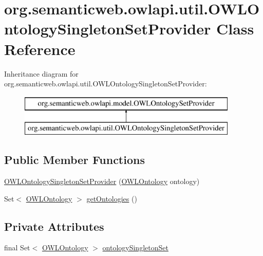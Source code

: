 \hypertarget{classorg_1_1semanticweb_1_1owlapi_1_1util_1_1_o_w_l_ontology_singleton_set_provider}{\section{org.\-semanticweb.\-owlapi.\-util.\-O\-W\-L\-Ontology\-Singleton\-Set\-Provider Class Reference}
\label{classorg_1_1semanticweb_1_1owlapi_1_1util_1_1_o_w_l_ontology_singleton_set_provider}
}
Inheritance diagram for org.\-semanticweb.\-owlapi.\-util.\-O\-W\-L\-Ontology\-Singleton\-Set\-Provider\-:\begin{figure}[H]
\begin{center}
\leavevmode
\includegraphics[height=2.000000cm]{classorg_1_1semanticweb_1_1owlapi_1_1util_1_1_o_w_l_ontology_singleton_set_provider}
\end{center}
\end{figure}
\subsection*{Public Member Functions}
\begin{DoxyCompactItemize}
\item 
\hyperlink{classorg_1_1semanticweb_1_1owlapi_1_1util_1_1_o_w_l_ontology_singleton_set_provider_a814a9665e0344720af43593ae91e731a}{O\-W\-L\-Ontology\-Singleton\-Set\-Provider} (\hyperlink{interfaceorg_1_1semanticweb_1_1owlapi_1_1model_1_1_o_w_l_ontology}{O\-W\-L\-Ontology} ontology)
\item 
Set$<$ \hyperlink{interfaceorg_1_1semanticweb_1_1owlapi_1_1model_1_1_o_w_l_ontology}{O\-W\-L\-Ontology} $>$ \hyperlink{classorg_1_1semanticweb_1_1owlapi_1_1util_1_1_o_w_l_ontology_singleton_set_provider_a3c30d79ea81f7f251f3189f958643ca8}{get\-Ontologies} ()
\end{DoxyCompactItemize}
\subsection*{Private Attributes}
\begin{DoxyCompactItemize}
\item 
final Set$<$ \hyperlink{interfaceorg_1_1semanticweb_1_1owlapi_1_1model_1_1_o_w_l_ontology}{O\-W\-L\-Ontology} $>$ \hyperlink{classorg_1_1semanticweb_1_1owlapi_1_1util_1_1_o_w_l_ontology_singleton_set_provider_a891abb6fc927613a2a23e78bf2663a6f}{ontology\-Singleton\-Set}
\end{DoxyCompactItemize}


